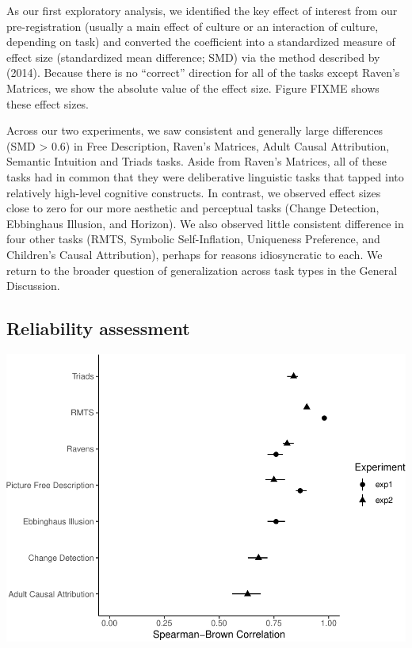 \documentclass[
  man]{apa6}
\begin{document}
As our first exploratory analysis, we identified the key effect of interest from our pre-registration (usually a main effect of culture or an interaction of culture, depending on task) and converted the coefficient into a standardized measure of effect size (standardized mean difference; SMD) via the method described by (2014). Because there is no ``correct'' direction for all of the tasks except Raven's Matrices, we show the absolute value of the effect size. Figure FIXME shows these effect sizes.

Across our two experiments, we saw consistent and generally large differences (SMD \textgreater{} 0.6) in Free Description, Raven's Matrices, Adult Causal Attribution, Semantic Intuition and Triads tasks. Aside from Raven's Matrices, all of these tasks had in common that they were deliberative linguistic tasks that tapped into relatively high-level cognitive constructs. In contrast, we observed effect sizes close to zero for our more aesthetic and perceptual tasks (Change Detection, Ebbinghaus Illusion, and Horizon). We also observed little consistent difference in four other tasks (RMTS, Symbolic Self-Inflation, Uniqueness Preference, and Children's Causal Attribution), perhaps for reasons idiosyncratic to each. We return to the broader question of generalization across task types in the General Discussion.

\hypertarget{reliability-assessment}{%
\subsection{Reliability assessment}\label{reliability-assessment}}

\includegraphics{CCRR_manuscript_files/figure-latex/unnamed-chunk-16-1.pdf}
\end{document}
